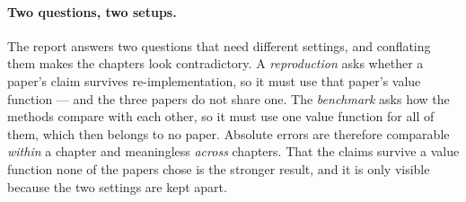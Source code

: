 \paragraph{Two questions, two setups.}
The report answers two questions that need different settings, and conflating them makes the
chapters look contradictory. A \emph{reproduction} asks whether a paper's claim survives
re-implementation, so it must use that paper's value function --- and the three papers do not
share one. The \emph{benchmark} asks how the methods compare with each other, so it must use
one value function for all of them, which then belongs to no paper. Absolute errors are
therefore comparable \emph{within} a chapter and meaningless \emph{across} chapters. That the
claims survive a value function none of the papers chose is the stronger result, and it is
only visible because the two settings are kept apart.
